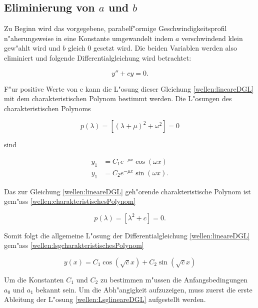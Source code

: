 \subsection{Eliminierung von $a$ und $b$}
\label{wellen:Eliminierungab}

Zu Beginn wird das vorgegebene, parabelf"ormige Geschwindigkeitsprofil 
n"aherungsweise in eine Konstante umgewandelt indem $a$ verschwindend klein 
gew"ahlt wird und $b$ gleich $0$ gesetzt wird. Die beiden Variablen werden also 
eliminiert und folgende Differentialgleichung wird betrachtet:

\begin{equation}
	y''+ cy = 0.
	\label{wellen:lineareDGL}
\end{equation}


F"ur positive Werte von c kann die L"osung dieser Gleichung 
\ref{wellen:lineareDGL} mit dem charakteristischen Polynom bestimmt werden. 
Die L"osungen des charakteristischen Polynoms

\begin{equation}
	p(\lambda) = [(\lambda+\mu)^2+\omega^2] =0
	\label{wellen:charakteristischesPolynom}
\end{equation}

sind

\begin{equation}
	\begin{split}
	y_1 &= C_1e^{-\mu x}\cos(\omega x) \\
	y_1 &= C_2e^{-\mu x}\sin(\omega x).
	\end{split}
	\label{wellen:lsgcharakteristischesPolynom}
\end{equation}

Das zur Gleichung \ref{wellen:lineareDGL} geh"orende charakteristische Polynom 
ist gem"ass \ref{wellen:charakteristischesPolynom}

\begin{equation*}
	p(\lambda) = [\lambda^2 + c] =0.
\end{equation*}

Somit folgt die allgemeine L"osung der Differentialgleichung 
\ref{wellen:lineareDGL} gem"ass \ref{wellen:lsgcharakteristischesPolynom}

\begin{equation}
	y(x) = C_1 \cos(\sqrt{c}x) + C_2 \sin(\sqrt{c}x)
	\label{wellen:LsglineareDGL}
\end{equation}

Um die Konstanten $C_1$ und $C_2$ zu bestimmen m"ussen die Anfangsbedingungen 
$a_0$ und $a_1$ bekannt sein. Um die Abh"angigkeit aufzuzeigen, muss zuerst die 
erste Ableitung der L"osung \ref{wellen:LsglineareDGL} aufgestellt werden.

